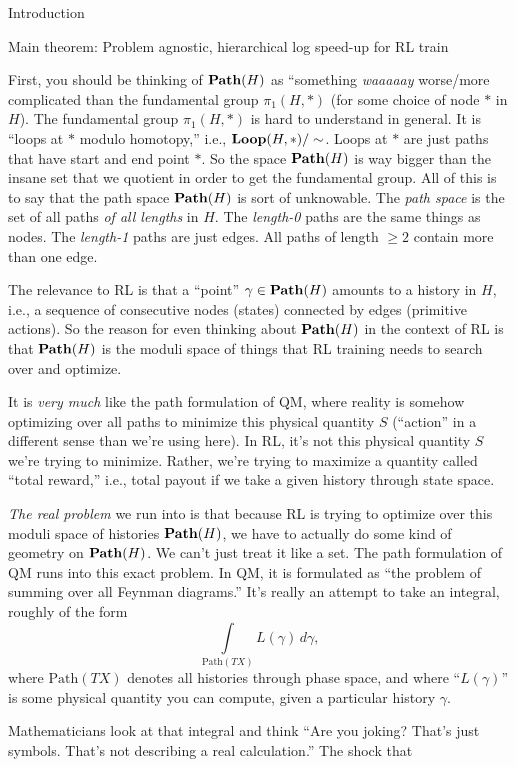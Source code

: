 \documentclass[11pt]{article}
\begin{document}
\begin{section}{Introduction}
\begin{subsection}{Main theorem: Problem agnostic, hierarchical log speed-up for RL train}
{First, you should be thinking of $\bold{Path}(H)$ as ``something {\em waaaaay} worse/more complicated than the fundamental group $\pi_{1}(H,\ast)$ (for some choice of node $\ast$ in $H$). The fundamental group $\pi_{1}(H,\ast)$ is hard to understand in general. It is ``loops at $\ast$ modulo homotopy,'' i.e., $\bold{Loop}(H, \ast)/\sim$. Loops at $\ast$ are just paths that have start and end point $\ast$. So the space $\bold{Path}(H)$ is way bigger than the insane set that we quotient in order to get the fundamental group. All of this is to say that the path space $\bold{Path}(H)$ is sort of unknowable. The {\em path space} is the set of all paths {\em of all lengths} in $H$. The {\em length-0} paths are the same things as nodes. The {\em length-1} paths are just edges. All paths of length $\ge 2$ contain more than one edge. 

The relevance to RL is that a ``point'' $\gamma\in\bold{Path}(H)$ amounts to a history in $H$, i.e., a sequence of consecutive nodes (states) connected by edges (primitive actions). So the reason for even thinking about $\bold{Path}(H)$ in the context of RL is that $\bold{Path}(H)$ is the moduli space of things that RL training needs to search over and optimize.

It is {\em very much} like the path formulation of QM, where reality is somehow optimizing over all paths to minimize this physical quantity $S$ (``action'' in a different sense than we're using here). In RL, it's not this physical quantity $S$ we're trying to minimize. Rather, we're trying to maximize a quantity called ``total reward,'' i.e., total payout if we take a given history through state space.

{\em The real problem} we run into is that because RL is trying to optimize over this moduli space of histories $\bold{Path}(H)$, we have to actually do some kind of geometry on $\bold{Path}(H)$. We can't just treat it like a set. The path formulation of QM runs into this exact problem. In QM, it is formulated as ``the problem of summing over all Feynman diagrams.'' It's really an attempt to take an integral, roughly of the form
$$
\underset{\text{Path}(TX)}{\int}\!\!\!\!\!\!L(\gamma)\,d\gamma,
$$
where $\text{Path}(TX)$ denotes all histories through phase space, and where ``$L(\gamma)$'' is some physical quantity you can compute, given a particular history $\gamma$. 

Mathematicians look at that integral and think ``Are you joking? That's just symbols. That's not describing a real calculation.'' The shock that

}
\end{subsection}
\end{section}
\end{document}
